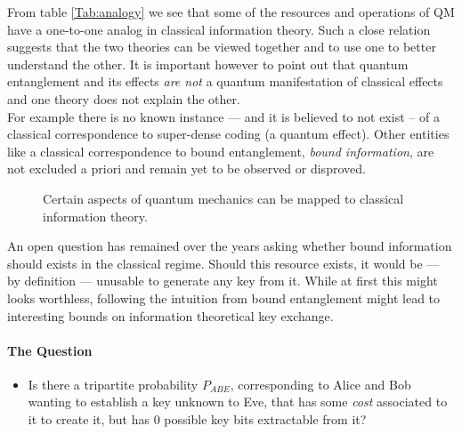 From table \ref{Tab:analogy} we see that some of the resources and operations of QM have a one-to-one analog in classical information theory. 
Such a close relation suggests that the two theories can be viewed together and to use one to better understand the other. 
It is important however to point out that quantum entanglement and its effects \emph{are not} a quantum manifestation of classical effects and one theory does not explain the other. \\
For example there is no known instance --- and it is believed to not exist -- of a classical correspondence to super-dense coding (a quantum effect). Other entities like a classical correspondence to bound entanglement, \emph{bound information}, are not excluded a priori and remain yet to be observed or disproved.\\

	\begin{figure}[h!]
		\centering
		
		\caption{Certain aspects of quantum mechanics can be mapped to classical information theory.}
		\label{Fig:bigpicture}
	\end{figure}
An open question has remained over the years asking whether bound information should exists in the classical regime.
Should this resource exists, it would be --- by definition --- unusable to generate any key from it.
While at first this might looks worthless, 
following the intuition from bound entanglement might lead to interesting bounds on information theoretical key exchange.\\

\paragraph*{The Question}
\begin{itemize}
		\item[] Is there a tripartite probability $P_{ABE}$, corresponding to Alice and Bob wanting to establish a key unknown to Eve, that has some \emph{cost} associated to it to create it, but has $0$ possible key bits extractable from it? 
\end{itemize}


	